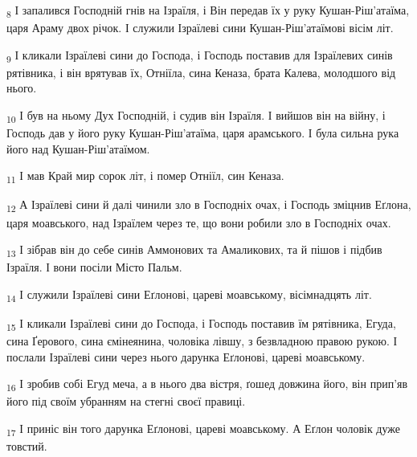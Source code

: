 \begin{tcolorbox}
\textsubscript{8} І запалився Господній гнів на Ізраїля, і Він передав їх у руку Кушан-Ріш'атаїма, царя Араму двох річок. І служили Ізраїлеві сини Кушан-Ріш'атаїмові вісім літ.
\end{tcolorbox}
\begin{tcolorbox}
\textsubscript{9} І кликали Ізраїлеві сини до Господа, і Господь поставив для Ізраїлевих синів рятівника, і він врятував їх, Отніїла, сина Кеназа, брата Калева, молодшого від нього.
\end{tcolorbox}
\begin{tcolorbox}
\textsubscript{10} І був на ньому Дух Господній, і судив він Ізраїля. І вийшов він на війну, і Господь дав у його руку Кушан-Ріш'атаїма, царя арамського. І була сильна рука його над Кушан-Ріш'атаїмом.
\end{tcolorbox}
\begin{tcolorbox}
\textsubscript{11} І мав Край мир сорок літ, і помер Отніїл, син Кеназа.
\end{tcolorbox}
\begin{tcolorbox}
\textsubscript{12} А Ізраїлеві сини й далі чинили зло в Господніх очах, і Господь зміцнив Еґлона, царя моавського, над Ізраїлем через те, що вони робили зло в Господніх очах.
\end{tcolorbox}
\begin{tcolorbox}
\textsubscript{13} І зібрав він до себе синів Аммонових та Амаликових, та й пішов і підбив Ізраїля. І вони посіли Місто Пальм.
\end{tcolorbox}
\begin{tcolorbox}
\textsubscript{14} І служили Ізраїлеві сини Еґлонові, цареві моавському, вісімнадцять літ.
\end{tcolorbox}
\begin{tcolorbox}
\textsubscript{15} І кликали Ізраїлеві сини до Господа, і Господь поставив їм рятівника, Егуда, сина Ґерового, сина ємінеянина, чоловіка лівшу, з безвладною правою рукою. І послали Ізраїлеві сини через нього дарунка Еґлонові, цареві моавському.
\end{tcolorbox}
\begin{tcolorbox}
\textsubscript{16} І зробив собі Егуд меча, а в нього два вістря, ґошед довжина його, він прип'яв його під своїм убранням на стегні своєї правиці.
\end{tcolorbox}
\begin{tcolorbox}
\textsubscript{17} І приніс він того дарунка Еґлонові, цареві моавському. А Еґлон чоловік дуже товстий.
\end{tcolorbox}
